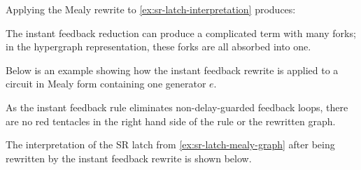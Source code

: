 \begin{example}\label{ex:sr-latch-mealy-graph}
    Applying the Mealy rewrite to \cref{ex:sr-latch-interpretation} produces:
    \vspace{-1em}
    \begin{center}
    \end{center}
\end{example}

The instant feedback reduction can produce a complicated term with many forks;
in the hypergraph representation, these forks are all absorbed into one.

\begin{example}\label{ex:instant-feedback-rewrite}
    Below is an example showing how the instant feedback rewrite is applied to
    a circuit in Mealy form containing one generator \(e\).
    \begin{center}
        
    \end{center}
\end{example}

As the instant feedback rule eliminates non-delay-guarded feedback loops, there
are no red tentacles in the right hand side of the rule or the rewritten graph.

\begin{example}\label{ex:sr-latch-instant-feedback-graph}
    The interpretation of the SR latch from \cref{ex:sr-latch-mealy-graph}
    after being rewritten by the instant feedback rewrite is shown below.
    \vspace{-1em}
    \begin{center}
    \end{center}
\end{example}

